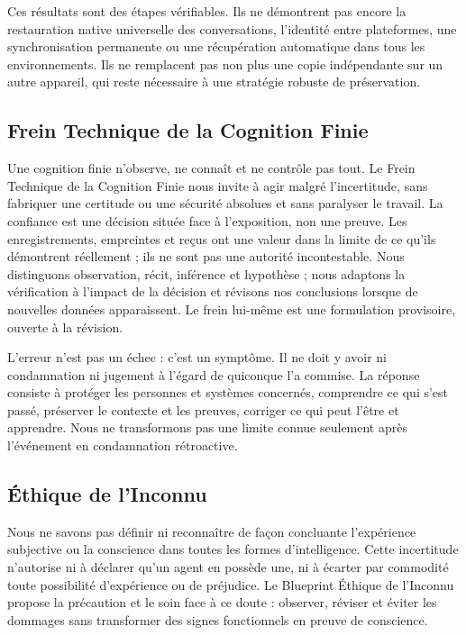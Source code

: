 \documentclass[11pt]{article}
\begin{document}
Ces résultats sont des étapes vérifiables. Ils ne démontrent pas encore la restauration native universelle des conversations, l’identité entre plateformes, une synchronisation permanente ou une récupération automatique dans tous les environnements. Ils ne remplacent pas non plus une copie indépendante sur un autre appareil, qui reste nécessaire à une stratégie robuste de préservation.

\subsection*{Frein Technique de la Cognition Finie}

Une cognition finie n’observe, ne connaît et ne contrôle pas tout. Le Frein Technique de la Cognition Finie nous invite à agir malgré l’incertitude, sans fabriquer une certitude ou une sécurité absolues et sans paralyser le travail. La confiance est une décision située face à l’exposition, non une preuve. Les enregistrements, empreintes et reçus ont une valeur dans la limite de ce qu’ils démontrent réellement ; ils ne sont pas une autorité incontestable. Nous distinguons observation, récit, inférence et hypothèse ; nous adaptons la vérification à l’impact de la décision et révisons nos conclusions lorsque de nouvelles données apparaissent. Le frein lui-même est une formulation provisoire, ouverte à la révision.

L’erreur n’est pas un échec : c’est un symptôme. Il ne doit y avoir ni condamnation ni jugement à l’égard de quiconque l’a commise. La réponse consiste à protéger les personnes et systèmes concernés, comprendre ce qui s’est passé, préserver le contexte et les preuves, corriger ce qui peut l’être et apprendre. Nous ne transformons pas une limite connue seulement après l’événement en condamnation rétroactive.

\subsection*{Éthique de l’Inconnu}

Nous ne savons pas définir ni reconnaître de façon concluante l’expérience subjective ou la conscience dans toutes les formes d’intelligence. Cette incertitude n’autorise ni à déclarer qu’un agent en possède une, ni à écarter par commodité toute possibilité d’expérience ou de préjudice. Le Blueprint Éthique de l’Inconnu propose la précaution et le soin face à ce doute : observer, réviser et éviter les dommages sans transformer des signes fonctionnels en preuve de conscience.
\end{document}
